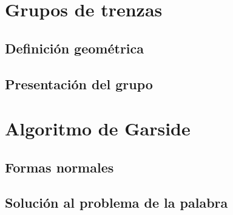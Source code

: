 \documentclass[bibtex, anon]{TEMat-article}
\begin{document}
\section{Grupos de trenzas}


\subsection{Definición geométrica}



\subsection{Presentación del grupo}



\section{Algoritmo de Garside}

\subsection{Formas normales}

\subsection{Solución al problema de la palabra}
\end{document}
